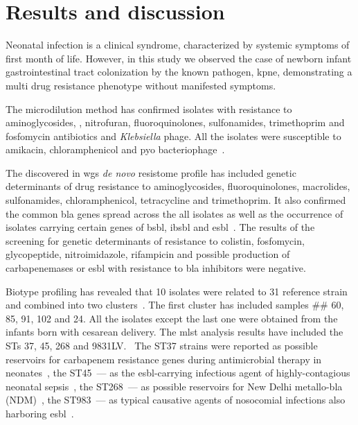 \section{Results and discussion}\label{sec:res_dis}
Neonatal infection is a clinical syndrome, characterized by systemic symptoms of first month of life.
However, in this study we observed the case of newborn infant gastrointestinal tract colonization by the known
pathogen, \gls{kpne}, demonstrating a multi drug resistance phenotype without manifested symptoms.

The microdilution method has confirmed isolates with resistance to aminoglycosides, \betalactam,
nitrofuran, fluoroquinolones, sulfonamides, trimethoprim and fosfomycin antibiotics and \textit{Klebsiella} phage.
All the isolates were susceptible to amikacin, chloramphenicol and pyo bacteriophage~.

The discovered in \gls{wgs} \textit{de novo} resistome profile has included genetic determinants of drug resistance to
aminoglycosides, fluoroquinolones, macrolides, sulfonamides, chloramphenicol, tetracycline and trimethoprim.
It also confirmed the common \gls{bla} genes spread across the all isolates as well as the occurrence of isolates
carrying certain genes of \gls{bsbl}, \gls{ibsbl} and \gls{esbl}~.
The results of the screening for genetic determinants of resistance to colistin, fosfomycin, glycopeptide,
nitroimidazole, rifampicin and possible production of carbapenemases or \gls{esbl} with resistance to \gls{bla}
inhibitors were negative.

Biotype profiling has revealed that 10 isolates were related to 31 reference strain and combined into two
clusters~.
The first cluster has included samples \#\# 60, 85, 91, 102 and 24.
All the isolates except the last one were obtained from the infants born with cesarean delivery.
The \gls{mlst} analysis results have included the STs 37, 45, 268 and 983\-1LV.~
The ST37 strains were reported as possible reservoirs for carbapenem resistance genes during antimicrobial therapy
in neonates~\cite{Li2017}, the ST45~--- as the \gls{esbl}-carrying infectious agent of highly-contagious
neonatal sepsis~\cite{Marando2018}, the ST268~--- as possible reservoirs for New Delhi metallo-\gls{bla}
(NDM)~\cite{Kiaei2019}, the ST983~--- as typical causative agents of nosocomial infections
also harboring \gls{esbl}~\cite{Founou2019}.

